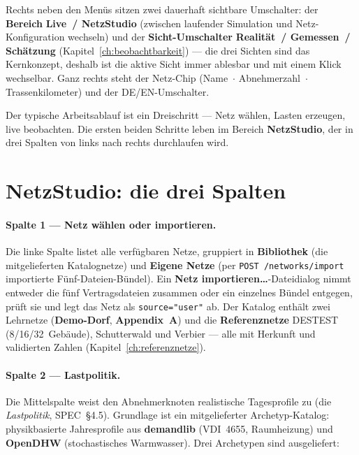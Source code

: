 \documentclass[11pt,a4paper,parskip=half]{scrreprt}
\newcommand{\ui}[1]{\textsf{\bfseries #1}}
\newcommand{\api}[1]{\texttt{#1}}
\begin{document}
Rechts neben den Menüs sitzen zwei dauerhaft sichtbare Umschalter: der
\textbf{Bereich} \ui{Live~/ NetzStudio} (zwischen laufender Simulation und
Netz-Konfiguration wechseln) und der \textbf{Sicht-Umschalter}
\ui{Realität~/ Gemessen~/ Schätzung} (Kapitel~\ref{ch:beobachtbarkeit}) --- die
drei Sichten sind das Kernkonzept, deshalb ist die aktive Sicht immer ablesbar
und mit einem Klick wechselbar. Ganz rechts steht der Netz-Chip (Name~$\cdot$
Abnehmerzahl~$\cdot$ Trassenkilometer) und der DE/EN-Umschalter.


Der typische Arbeitsablauf ist ein Dreischritt --- Netz wählen, Lasten erzeugen,
live beobachten. Die ersten beiden Schritte leben im Bereich \ui{NetzStudio},
der in drei Spalten von links nach rechts durchlaufen wird.

\section{NetzStudio: die drei Spalten}
\label{sec:netzstudio}

\paragraph{Spalte 1 --- Netz wählen oder importieren.} Die linke Spalte listet
alle verfügbaren Netze, gruppiert in \ui{Bibliothek} (die mitgelieferten
Katalognetze) und \ui{Eigene Netze} (per \api{POST /networks/import}
importierte Fünf-Dateien-Bündel). Ein \ui{Netz importieren…}-Dateidialog nimmt
entweder die fünf Vertragsdateien zusammen oder ein einzelnes Bündel entgegen,
prüft sie und legt das Netz als \api{source="user"} ab. Der Katalog enthält
zwei Lehrnetze (\ui{Demo-Dorf}, \ui{Appendix~A}) und die
\textbf{Referenznetze} DESTEST (8/16/32~Gebäude), Schutterwald und Verbier ---
alle mit Herkunft und validierten Zahlen (Kapitel~\ref{ch:referenznetze}).

\paragraph{Spalte 2 --- Lastpolitik.} Die Mittelspalte weist den Abnehmerknoten
realistische Tagesprofile zu (die \emph{Lastpolitik}, SPEC~\S4.5). Grundlage ist
ein mitgelieferter Archetyp-Katalog: physikbasierte Jahresprofile aus
\textbf{demandlib} (VDI~4655, Raumheizung) und \textbf{OpenDHW} (stochastisches
Warmwasser). Drei Archetypen sind ausgeliefert:
\end{document}
